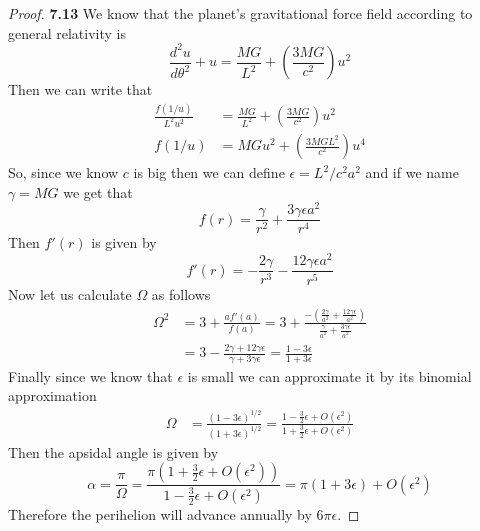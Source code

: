 \documentclass[11pt]{article}
\theoremstyle{definition}
\begin{document}
	\begin{proof}{\textbf{7.13}}
        We know that the planet's gravitational force field according to general
        relativity is
        $$\frac{d^2u}{d\theta^2} + u = \frac{MG}{L^2} + \left(\frac{3MG}{c^2}\right)u^2$$
        Then we can write that
        \begin{align*}
            \frac{f(1/u)}{L^2u^2} &= \frac{MG}{L^2} + \left(\frac{3MG}{c^2}\right)u^2\\
            f(1/u) &= MGu^2 + \left(\frac{3MGL^2}{c^2}\right)u^4
        \end{align*}
        So, since we know $c$ is big then we can define $\epsilon = L^2/c^2a^2$ and
        if we name $\gamma = MG$ we get that
        $$f(r) = \frac{\gamma}{r^2} + \frac{3\gamma\epsilon a^2}{r^4}$$
        Then $f'(r)$ is given by
        $$f'(r) = -\frac{2\gamma}{r^3} - \frac{12\gamma\epsilon a^2}{r^5}$$
        Now let us calculate $\Omega$ as follows
        \begin{align*}
            \Omega^2 &= 3 + \frac{af'(a)}{f(a)}
                = 3 + \frac{-(\frac{2\gamma}{a^2} + \frac{12\gamma\epsilon}{a^2})}
                {\frac{\gamma}{a^2} + \frac{3\gamma\epsilon}{a^2}}\\
                &= 3 - \frac{2\gamma + 12\gamma\epsilon}{\gamma + 3\gamma\epsilon}
                = \frac{1 - 3\epsilon}{1 + 3\epsilon}
        \end{align*}
        Finally since we know that $\epsilon$ is small we can approximate it by its
        binomial approximation
        \begin{align*}
            \Omega &= \frac{(1 - 3\epsilon)^{1/2}}
            {(1 + 3\epsilon)^{1/2}}
            = \frac{1 - \frac{3}{2}\epsilon + O(\epsilon^2)}
            {1 + \frac{3}{2}\epsilon + O(\epsilon^2)}
        \end{align*}
        Then the apsidal angle is given by
        $$\alpha = \frac{\pi}{\Omega}
        = \frac{\pi(1+\frac{3}{2}\epsilon + O(\epsilon^2))}
        {1-\frac{3}{2}\epsilon + O(\epsilon^2)}
        = \pi(1 + 3\epsilon) + O(\epsilon^2)$$
        Therefore the perihelion will advance annually by $6\pi\epsilon$.
    \end{proof}
\cleardoublepage
\end{document}
